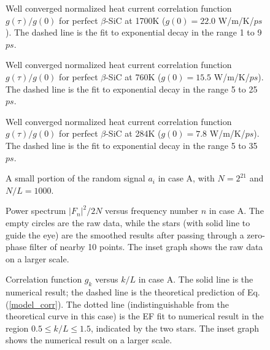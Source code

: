 \begin{figure}
\caption{Well converged normalized heat current correlation function
  $g(\tau)/g(0)$ for perfect $\beta$-SiC at 1700K ($g(0) = 22.0$
  W/m/K/$ps$). The dashed line is the fit to exponential decay in the
  range 1 to 9 $ps$.}
\label{per_corr_1700}
\end{figure}

\begin{figure}
\caption{Well converged normalized heat current correlation function
  $g(\tau)/g(0)$ for perfect $\beta$-SiC at 760K ($g(0) = 15.5$
  W/m/K/$ps$). The dashed line is the fit to exponential decay in the
  range 5 to 25 $ps$.}
\label{per_corr_760}
\end{figure}

\begin{figure}
\caption{Well converged normalized heat current correlation function 
  $g(\tau)/g(0)$ for perfect $\beta$-SiC at 284K ($g(0) = 7.8$
  W/m/K/$ps$). The dashed line is the fit to exponential decay in the
  range 5 to 35 $ps$.}
\label{per_corr_284}
\end{figure}

\begin{figure}
\caption{A small portion of the random signal $a_i$ in case A, with
  $N=2^{21}$ and $N/L=1000$.}
\label{signal}
\end{figure}

\begin{figure}
\caption{Power spectrum $|F_n|^2/2N$ versus frequency number $n$ in
  case A. The empty circles are the raw data, while the stars (with
  solid line to guide the eye) are the smoothed results after passing
  through a zero-phase filter of nearby 10 points. The inset graph
  shows the raw data on a larger scale.}
\label{spectra1000}
\end{figure}

\begin{figure}
\caption{Correlation function $g_k$ versus $k/L$ in case A.
  The solid line is the numerical result; the dashed line is the
  theoretical prediction of Eq. (\protect\ref{model_corr}). The dotted
  line (indistinguishable from the theoretical curve in this case) is
  the EF fit to numerical result in the region $0.5 \le k/L \le 1.5$,
  indicated by the two stars. The inset graph shows the numerical
  result on a larger scale.}
\label{corr1000}
\end{figure}

